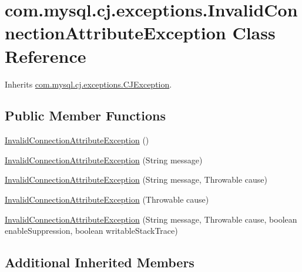 \hypertarget{classcom_1_1mysql_1_1cj_1_1exceptions_1_1_invalid_connection_attribute_exception}{}\section{com.\+mysql.\+cj.\+exceptions.\+Invalid\+Connection\+Attribute\+Exception Class Reference}
\label{classcom_1_1mysql_1_1cj_1_1exceptions_1_1_invalid_connection_attribute_exception}


Inherits \mbox{\hyperlink{classcom_1_1mysql_1_1cj_1_1exceptions_1_1_c_j_exception}{com.\+mysql.\+cj.\+exceptions.\+C\+J\+Exception}}.

\subsection*{Public Member Functions}
\begin{DoxyCompactItemize}
\item 
\mbox{\hyperlink{classcom_1_1mysql_1_1cj_1_1exceptions_1_1_invalid_connection_attribute_exception_a8176a904ee1c45bbfa61f852386f1c42}{Invalid\+Connection\+Attribute\+Exception}} ()
\item 
\mbox{\hyperlink{classcom_1_1mysql_1_1cj_1_1exceptions_1_1_invalid_connection_attribute_exception_aeb0d965c234bd80e7d66f46f9c5b7a33}{Invalid\+Connection\+Attribute\+Exception}} (String message)
\item 
\mbox{\hyperlink{classcom_1_1mysql_1_1cj_1_1exceptions_1_1_invalid_connection_attribute_exception_a3656f26296b5402dc559f2e0bd3bac4d}{Invalid\+Connection\+Attribute\+Exception}} (String message, Throwable cause)
\item 
\mbox{\hyperlink{classcom_1_1mysql_1_1cj_1_1exceptions_1_1_invalid_connection_attribute_exception_ac0691e852584fa7f2b96bac12e6c5ebc}{Invalid\+Connection\+Attribute\+Exception}} (Throwable cause)
\item 
\mbox{\hyperlink{classcom_1_1mysql_1_1cj_1_1exceptions_1_1_invalid_connection_attribute_exception_aa17841838d6c42e697caf8b856a2b18e}{Invalid\+Connection\+Attribute\+Exception}} (String message, Throwable cause, boolean enable\+Suppression, boolean writable\+Stack\+Trace)
\end{DoxyCompactItemize}
\subsection*{Additional Inherited Members}


